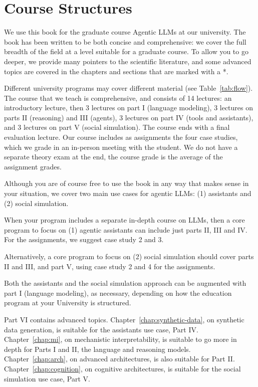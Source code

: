 \section{Course Structures}
We use this book for the graduate course Agentic LLMs at our university. The book has been written to be both concise and comprehensive: we  cover the full breadth of the field at a level suitable for a graduate course. To allow you to go deeper, we provide many pointers to the scientific literature, and some advanced topics are covered in the chapters and sections that are marked with a *. 

Different university programs may cover different material (see  Table~\ref{tab:flow}). The course that we teach is comprehensive, and consists of 14 lectures: an introductory lecture, then 3 lectures on part I (language modeling), 3 lectures on parts II (reasoning) and III (agents), 3 lectures on part IV (tools and assistants), and 3 lectures on part V (social simulation). The course ends with a final evaluation lecture. Our course includes as assignments the four case studies, which we grade in an in-person meeting with the student. We do not have a separate theory exam at the end, the course grade is the average of the assignment grades.

Although you are of course free to use the book in any way that makes sense in your situation, we cover two main use cases for agentic LLMs: (1) assistants and (2) social simulation.

When your program includes a separate in-depth course on LLMs, then a core program to focus on (1) agentic assistants can include just parts II, III and IV. For the assignments, we suggest case study 2 and 3.

Alternatively, a core program to focus on (2) social simulation should cover parts II and III, and part V, using case study 2 and 4 for the assignments. 

Both the assistants and the social simulation approach can be augmented with part I (language modeling), as necessary, depending on how the education program at your University is structured.

Part VI contains advanced topics. Chapter~\ref{chap:synthetic-data}, on synthetic data generation, is suitable for the  assistants use case, Part IV. Chapter~\ref{chap:mi}, on mechanistic interpretability, is suitable to go more in depth for Parts I and II, the language and reasoning models. 
Chapter~\ref{chap:arch}, on advanced architectures, is also suitable for Part II.
Chapter~\ref{chap:cognition}, on cognitive architectures, is suitable for the social simulation use case, Part V.

